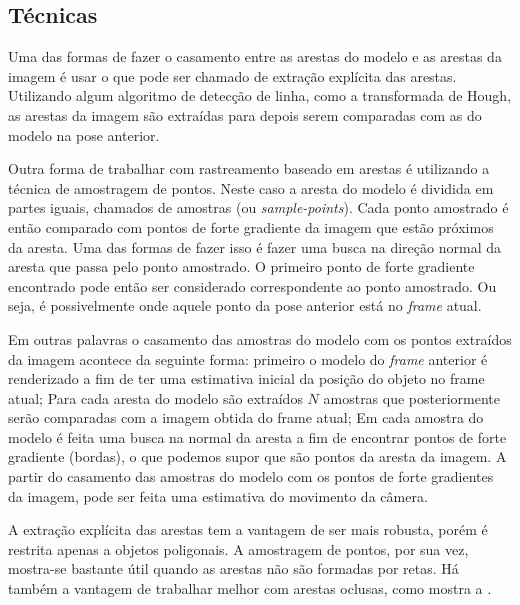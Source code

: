 \subsection{Técnicas}

Uma das formas de fazer o casamento entre as arestas do modelo e as arestas da imagem é usar o que pode ser chamado de extração explícita das arestas. Utilizando algum algoritmo de detecção de linha, como a transformada de Hough, as arestas da imagem são extraídas para depois serem comparadas com as do modelo na pose anterior. %


Outra forma de trabalhar com rastreamento baseado em arestas é utilizando a técnica de amostragem de pontos. Neste caso a aresta do modelo é dividida em partes iguais, chamados de amostras (ou \emph{sample-points}). Cada ponto amostrado é então comparado com pontos de forte gradiente da imagem que estão próximos da aresta. Uma das formas de fazer isso é fazer uma busca na direção normal da aresta que passa pelo ponto amostrado. O primeiro ponto de forte gradiente encontrado pode então ser considerado correspondente ao ponto amostrado. Ou seja, é possivelmente onde aquele ponto da pose anterior está no \emph{frame} atual.


Em outras palavras o casamento das amostras do modelo com os pontos extraídos da imagem acontece da seguinte forma: primeiro o modelo do \emph{frame} anterior é renderizado a fim de ter uma estimativa inicial da posição do objeto no frame atual; Para cada aresta do modelo são extraídos $N$ amostras que posteriormente serão comparadas com a imagem obtida do frame atual; Em cada amostra do modelo é feita uma busca na normal da aresta a fim de encontrar pontos de forte gradiente (bordas), o que podemos supor que são pontos da aresta da imagem. A partir do casamento das amostras do modelo com os pontos de forte gradientes da imagem, pode ser feita uma estimativa do movimento da câmera.

A extração explícita das arestas tem a vantagem de ser mais robusta, porém é restrita apenas a objetos poligonais. A amostragem de pontos, por sua vez, mostra-se bastante útil quando as arestas não são formadas por retas. Há também a vantagem de trabalhar melhor com arestas oclusas, como mostra a .

